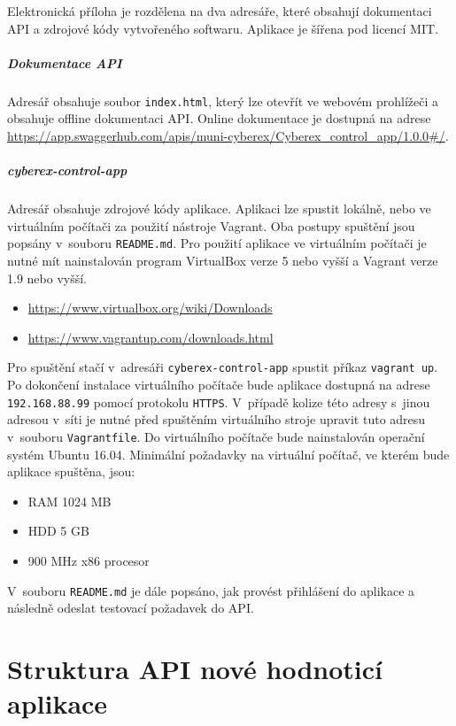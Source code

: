 \documentclass[
  digital,
  twoside,
  table, 
  nolof, 
  nolot
]{fithesis3}
\begin{document}
Elektronická příloha je rozdělena na dva adresáře, které obsahují dokumentaci API a zdrojové kódy vytvořeného softwaru. Aplikace je šířena pod licencí MIT.

\paragraph{Dokumentace API} Adresář obsahuje soubor \texttt{index.html}, který lze otevřít ve webovém prohlížeči a obsahuje offline dokumentaci API. Online dokumentace je dostupná na adrese \url{https://app.swaggerhub.com/apis/muni-cyberex/Cyberex_control_app/1.0.0#/}.
    
\paragraph{cyberex-control-app} Adresář obsahuje zdrojové kódy aplikace. Aplikaci lze spustit lokálně, nebo ve virtuálním počítači za použití nástroje Vagrant. Oba postupy spuštění jsou popsány v~souboru \texttt{README.md}.
Pro použití aplikace ve virtuálním počítači je nutné mít nainstalován program VirtualBox verze 5 nebo vyšší a Vagrant verze 1.9 nebo vyšší.
\begin{itemize}
    \item \url{https://www.virtualbox.org/wiki/Downloads}
    \item \url{https://www.vagrantup.com/downloads.html}
\end{itemize}
Pro spuštění stačí v~adresáři \texttt{cyberex-control-app} spustit příkaz \texttt{vagrant up}.
Po dokončení instalace virtuálního počítače bude aplikace dostupná na adrese
\texttt{192.168.88.99} pomocí protokolu \texttt{HTTPS}. V~případě kolize této adresy s~jinou adresou v~síti je nutné před spuštěním virtuálního stroje upravit tuto adresu v~souboru \texttt{Vagrantfile}.
Do virtuálního počítače bude nainstalován operační systém Ubuntu 16.04.
Minimální požadavky na virtuální počítač, ve kterém bude aplikace spuštěna,
jsou:
\begin{itemize}
    \item RAM 1024 MB
    \item HDD 5 GB
    \item 900 MHz x86 procesor
\end{itemize}
V~souboru \texttt{README.md} je dále popsáno, jak provést přihlášení do aplikace a následně odeslat testovací požadavek do API.

\chapter{Struktura API nové hodnoticí aplikace}
\label{appendAPI}
\end{document}
